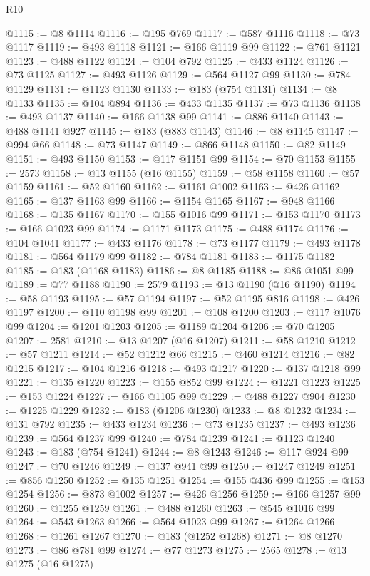 \begin{lexlean}{R10}
\begin{coremodule}
@1115 := @8 @1114
@1116 := @195 @769
@1117 := @587 @1116
@1118 := @73 @1117
@1119 := @493 @1118
@1121 := @166 @1119 @99
@1122 := @761 @1121
@1123 := @488 @1122
@1124 := @104 @792
@1125 := @433 @1124
@1126 := @73 @1125
@1127 := @493 @1126
@1129 := @564 @1127 @99
@1130 := @784 @1129
@1131 := @1123 @1130
@1133 := @183 (@754 @1131)
@1134 := @8 @1133
@1135 := @104 @894
@1136 := @433 @1135
@1137 := @73 @1136
@1138 := @493 @1137
@1140 := @166 @1138 @99
@1141 := @886 @1140
@1143 := @488 @1141 @927
@1145 := @183 (@883 @1143)
@1146 := @8 @1145
@1147 := @994 @66
@1148 := @73 @1147
@1149 := @866 @1148
@1150 := @82 @1149
@1151 := @493 @1150
@1153 := @117 @1151 @99
@1154 := @70 @1153
@1155 := 2573
@1158 := @13 @1155 (@16 @1155)
@1159 := @58 @1158
@1160 := @57 @1159
@1161 := @52 @1160
@1162 := @1161 @1002
@1163 := @426 @1162
@1165 := @137 @1163 @99
@1166 := @1154 @1165
@1167 := @948 @1166
@1168 := @135 @1167
@1170 := @155 @1016 @99
@1171 := @153 @1170
@1173 := @166 @1023 @99
@1174 := @1171 @1173
@1175 := @488 @1174
@1176 := @104 @1041
@1177 := @433 @1176
@1178 := @73 @1177
@1179 := @493 @1178
@1181 := @564 @1179 @99
@1182 := @784 @1181
@1183 := @1175 @1182
@1185 := @183 (@1168 @1183)
@1186 := @8 @1185
@1188 := @86 @1051 @99
@1189 := @77 @1188
@1190 := 2579
@1193 := @13 @1190 (@16 @1190)
@1194 := @58 @1193
@1195 := @57 @1194
@1197 := @52 @1195 @816
@1198 := @426 @1197
@1200 := @110 @1198 @99
@1201 := @108 @1200
@1203 := @117 @1076 @99
@1204 := @1201 @1203
@1205 := @1189 @1204
@1206 := @70 @1205
@1207 := 2581
@1210 := @13 @1207 (@16 @1207)
@1211 := @58 @1210
@1212 := @57 @1211
@1214 := @52 @1212 @66
@1215 := @460 @1214
@1216 := @82 @1215
@1217 := @104 @1216
@1218 := @493 @1217
@1220 := @137 @1218 @99
@1221 := @135 @1220
@1223 := @155 @852 @99
@1224 := @1221 @1223
@1225 := @153 @1224
@1227 := @166 @1105 @99
@1229 := @488 @1227 @904
@1230 := @1225 @1229
@1232 := @183 (@1206 @1230)
@1233 := @8 @1232
@1234 := @131 @792
@1235 := @433 @1234
@1236 := @73 @1235
@1237 := @493 @1236
@1239 := @564 @1237 @99
@1240 := @784 @1239
@1241 := @1123 @1240
@1243 := @183 (@754 @1241)
@1244 := @8 @1243
@1246 := @117 @924 @99
@1247 := @70 @1246
@1249 := @137 @941 @99
@1250 := @1247 @1249
@1251 := @856 @1250
@1252 := @135 @1251
@1254 := @155 @436 @99
@1255 := @153 @1254
@1256 := @873 @1002
@1257 := @426 @1256
@1259 := @166 @1257 @99
@1260 := @1255 @1259
@1261 := @488 @1260
@1263 := @545 @1016 @99
@1264 := @543 @1263
@1266 := @564 @1023 @99
@1267 := @1264 @1266
@1268 := @1261 @1267
@1270 := @183 (@1252 @1268)
@1271 := @8 @1270
@1273 := @86 @781 @99
@1274 := @77 @1273
@1275 := 2565
@1278 := @13 @1275 (@16 @1275)

\end{coremodule}
\end{lexlean}
